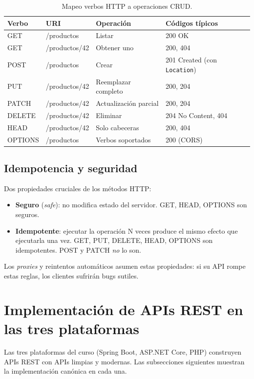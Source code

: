 \begin{table}[htbp]
\centering
\caption{Mapeo verbos HTTP a operaciones CRUD.}
\footnotesize
\begin{tabularx}{\textwidth}{llXX}
\toprule
\textbf{Verbo} & \textbf{URI} & \textbf{Operación} & \textbf{Códigos típicos}\\
\midrule
GET & /productos & Listar & 200 OK \\
GET & /productos/42 & Obtener uno & 200, 404 \\
POST & /productos & Crear & 201 Created (con \texttt{Location}) \\
PUT & /productos/42 & Reemplazar completo & 200, 204 \\
PATCH & /productos/42 & Actualización parcial & 200, 204 \\
DELETE & /productos/42 & Eliminar & 204 No Content, 404 \\
HEAD & /productos/42 & Solo cabeceras & 200, 404 \\
OPTIONS & /productos & Verbos soportados & 200 (CORS) \\
\bottomrule
\end{tabularx}
\end{table}

\subsection{Idempotencia y seguridad}

Dos propiedades cruciales de los métodos HTTP:

\begin{itemize}
\item \textbf{Seguro} (\emph{safe}): no modifica estado del servidor.
GET, HEAD, OPTIONS son seguros.
\item \textbf{Idempotente}: ejecutar la operación N veces produce el
mismo efecto que ejecutarla una vez. GET, PUT, DELETE, HEAD, OPTIONS
son idempotentes. POST y PATCH \emph{no} lo son.
\end{itemize}

Los \emph{proxies} y reintentos automáticos asumen estas propiedades:
si su API rompe estas reglas, los clientes sufrirán bugs sutiles.

\section{Implementación de APIs REST en las tres plataformas}

Las tres plataformas del curso (Spring Boot, ASP.NET Core,
PHP) construyen APIs REST con APIs limpias y modernas. Las
subsecciones siguientes muestran la implementación canónica en cada
una.


